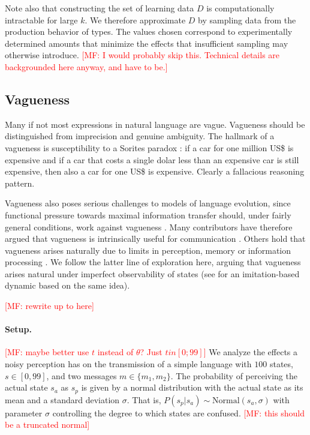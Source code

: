 \documentclass[10pt,a4paper]{article}
\newcommand{\mf}[1]{\textcolor{Red}{[MF: #1]}}
\begin{document}
Note also that constructing the set of learning data $D$ is computationally intractable for
large $k$. We therefore approximate $D$ by sampling data from the production behavior of
types. The values chosen correspond to experimentally determined amounts that minimize the
effects that insufficient sampling may otherwise introduce. \mf{I would probably skip
  this. Technical details are backgrounded here anyway, and have to be.}

\subsection{Vagueness}

Many if not most expressions in natural language are vague. Vagueness should be distinguished
from imprecision and genuine ambiguity. The hallmark of a vagueness is susceptibility to a
Sorites paradox \citep[e.g.][]{Williamson1994:Vagueness}: if a car for one million US\$ is
expensive and if a car that costs a single dolar less than an expensive car is still expensive,
then also a car for one US\$ is expensive. Clearly a fallacious reasoning pattern.

Vagueness also poses serious challenges to models of language evolution, since functional
pressure towards maximal information transfer should, under fairly general conditions, work
against vagueness \citep{Lipman2009:Why-is-Language}. Many contributors have therefore argued
that vagueness is intrinsically useful for communication
\citep[e.g.][]{Deemter2009:Utility-and-Lan,Jaegherde-JaegherRooijvan-Rooij2010:Strategic-Vague,BlumeBoard2013:Intentional-Vag}. Others
hold that vagueness arises naturally due to limits in perception, memory or information
processing
\citep[e.g.][]{FrankeJager2010:Vagueness-Signa,LassiterGoodman2015:Adjectival-vagu,OConnor2013:The-Evolution-o}. We
follow the latter line of exploration here, arguing that vagueness arises natural under
imperfect observability of states (see \cite{franke+correia:toappear} for an imitation-based
dynamic based on the same idea).

\mf{rewrite up to here}

\paragraph{Setup.} \mf{maybe better use $t$ instead of $\theta$? Just $t in [0;99]$} We analyze
the effects a noisy perception has on the transmission of a simple language with $100$
states, $s \in [0,99]$, and two messages $m \in \{m_1,m_2\}$. The probability of perceiving the
actual state $s_a$ as $s_p$ is given by a normal distribution with the actual state as its mean
and a standard deviation $\sigma$. That is, $P(s_p | s_a) \sim \text{Normal}(s_{a},\sigma)$
with parameter $\sigma$ controlling the degree to which states are confused. \mf{this should be
a truncated normal}
\end{document}
